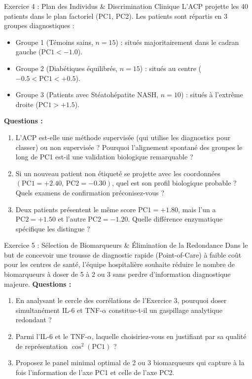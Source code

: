 \documentclass[11pt,a4paper]{article}
\begin{document}
\begin{exercicebox}{Exercice 4 : Plan des Individus \& Discrimination Clinique}
L'ACP projette les 40 patients dans le plan factoriel (PC1, PC2). Les patients sont répartis en 3 groupes diagnostiques :
\begin{itemize}
  \item Groupe 1 (Témoins sains, $n=15$) : situés majoritairement dans le cadran gauche ($\text{PC1} < -1.0$).
  \item Groupe 2 (Diabétiques équilibrés, $n=15$) : situés au centre ($-0.5 < \text{PC1} < +0.5$).
  \item Groupe 3 (Patients avec Stéatohépatite NASH, $n=10$) : situés à l'extrême droite ($\text{PC1} > +1.5$).
\end{itemize}

\textbf{Questions :}
\begin{enumerate}[label=\textbf{\alph*.}]
  \item L'ACP est-elle une méthode supervisée (qui utilise les diagnostics pour classer) ou non supervisée ? Pourquoi l'alignement spontané des groupes le long de PC1 est-il une validation biologique remarquable ?
  \item Si un nouveau patient non étiqueté se projette avec les coordonnées $(\text{PC1} = +2.40, \, \text{PC2} = -0.30)$, quel est son profil biologique probable ? Quels examens de confirmation préconisez-vous ?
  \item Deux patients présentent le même score $\text{PC1} = +1.80$, mais l'un a $\text{PC2} = +1.50$ et l'autre $\text{PC2} = -1.20$. Quelle différence enzymatique spécifique les distingue ?
\end{enumerate}
\end{exercicebox}

\begin{exercicebox}{Exercice 5 : Sélection de Biomarqueurs \& Élimination de la Redondance}
Dans le but de concevoir une trousse de diagnostic rapide (Point-of-Care) à faible coût pour les centres de santé, l'équipe hospitalière souhaite réduire le nombre de biomarqueurs à doser de 5 à 2 ou 3 sans perdre d'information diagnostique majeure.
\textbf{Questions :}
\begin{enumerate}[label=\textbf{\alph*.}]
  \item En analysant le cercle des corrélations de l'Exercice 3, pourquoi doser simultanément IL-6 et TNF-$\alpha$ constitue-t-il un gaspillage analytique redondant ?
  \item Parmi l'IL-6 et le TNF-$\alpha$, laquelle choisiriez-vous en justifiant par sa qualité de représentation $\cos^2(\text{PC1})$ ?
  \item Proposez le panel minimal optimal de 2 ou 3 biomarqueurs qui capture à la fois l'information de l'axe PC1 et celle de l'axe PC2.
\end{enumerate}
\end{exercicebox}
\end{document}
